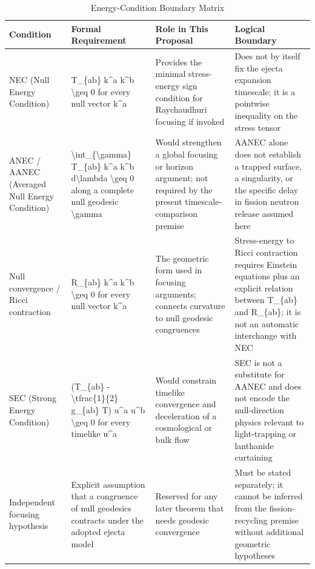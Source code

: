 \documentclass[conference]{IEEEtran}
\begin{document}
\begin{table}[htbp]
\centering
\footnotesize
\setlength{\tabcolsep}{3pt}
\renewcommand{\arraystretch}{1.12}
\caption{Energy-Condition Boundary Matrix}
\label{tab:appendix-variables-and-definitions-b2}
\begin{tabular}{|p{}|p{}|p{}|p{}|}
\hline
Condition & Formal Requirement & Role in This Proposal & Logical Boundary \\\hline
NEC (Null Energy Condition) & T\_\{ab\} k\textasciicircum{}a k\textasciicircum{}b \textbackslash{}geq 0 for every null vector k\textasciicircum{}a & Provides the minimal stress-energy sign condition for Raychaudhuri focusing if invoked & Does not by itself fix the ejecta expansion timescale; it is a pointwise inequality on the stress tensor \\\hline
ANEC / AANEC (Averaged Null Energy Condition) & \textbackslash{}int\_\{\textbackslash{}gamma\} T\_\{ab\} k\textasciicircum{}a k\textasciicircum{}b d\textbackslash{}lambda \textbackslash{}geq 0 along a complete null geodesic \textbackslash{}gamma & Would strengthen a global focusing or horizon argument; not required by the present timescale-comparison premise & AANEC alone does not establish a trapped surface, a singularity, or the specific delay in fission neutron release assumed here \\\hline
Null convergence / Ricci contraction & R\_\{ab\} k\textasciicircum{}a k\textasciicircum{}b \textbackslash{}geq 0 for every null vector k\textasciicircum{}a & The geometric form used in focusing arguments; connects curvature to null geodesic congruences & Stress-energy to Ricci contraction requires Einstein equations plus an explicit relation between T\_\{ab\} and R\_\{ab\}; it is not an automatic interchange with NEC \\\hline
SEC (Strong Energy Condition) & (T\_\{ab\} - \textbackslash{}tfrac\{1\}\{2\} g\_\{ab\} T) u\textasciicircum{}a u\textasciicircum{}b \textbackslash{}geq 0 for every timelike u\textasciicircum{}a & Would constrain timelike convergence and deceleration of a cosmological or bulk flow & SEC is not a substitute for AANEC and does not encode the null-direction physics relevant to light-trapping or lanthanide curtaining \\\hline
Independent focusing hypothesis & Explicit assumption that a congruence of null geodesics contracts under the adopted ejecta model & Reserved for any later theorem that needs geodesic convergence & Must be stated separately; it cannot be inferred from the fission-recycling premise without additional geometric hypotheses \\\hline
\end{tabular}
\end{table}
\end{document}
